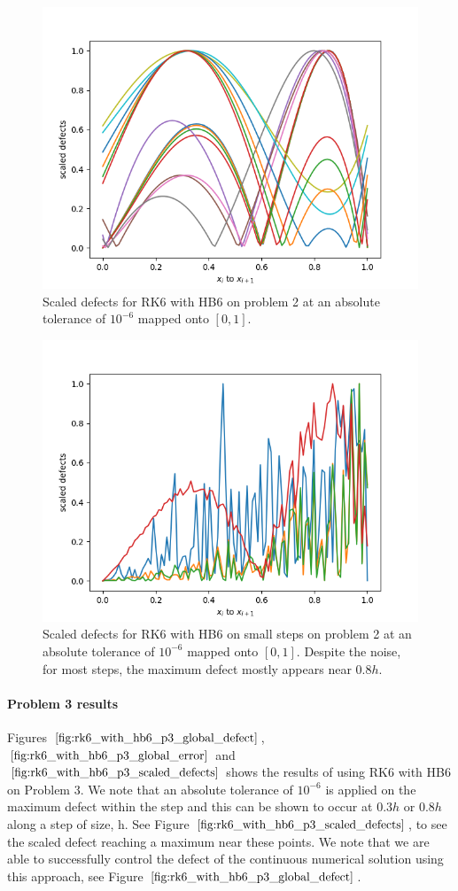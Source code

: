 \begin{figure}[H]
\centering
\includegraphics[width=0.7\linewidth]{./figures/rk6_with_hb6_p2_scaled_defects}
\caption{Scaled defects for RK6 with HB6 on problem 2 at an absolute tolerance of $10^{-6}$ mapped onto $[0, 1]$.}
\label{fig:rk6_with_hb6_p2_scaled_defects}
\end{figure}

\begin{figure}[H]
\centering
\includegraphics[width=0.7\linewidth]{./figures/rk6_with_hb6_p2_scaled_defects_small_steps}
\caption{Scaled defects for RK6 with HB6 on small steps on problem 2 at an absolute tolerance of $10^{-6}$ mapped onto $[0, 1]$. Despite the noise, for most steps, the maximum defect mostly appears near $0.8h$.}
\label{fig:rk6_with_hb6_p2_scaled_defects_small_steps}
\end{figure}

\paragraph{Problem 3 results}
Figures $\ref{fig:rk6_with_hb6_p3_global_defect}$, $\ref{fig:rk6_with_hb6_p3_global_error}$ and $\ref{fig:rk6_with_hb6_p3_scaled_defects}$ shows the results of using RK6 with HB6 on Problem 3. 
We note that an absolute tolerance of $10^{-6}$ is applied on the maximum defect within the step and this can be shown to occur at $0.3h$ or $0.8h$ along a step of size, h. See Figure $\ref{fig:rk6_with_hb6_p3_scaled_defects}$, to see the scaled defect reaching a maximum near these points. We note that we are able to successfully control the defect of the continuous numerical solution using this approach, see Figure $\ref{fig:rk6_with_hb6_p3_global_defect}$. 

